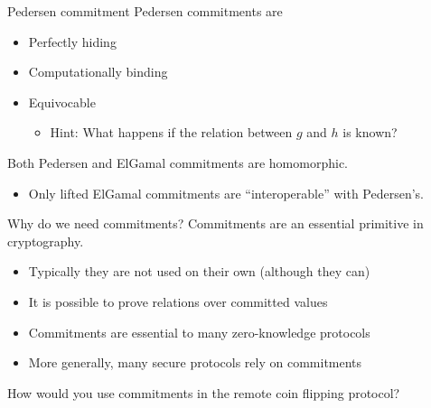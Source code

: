 \begin{frame}{Pedersen commitment}
  Pedersen commitments are
  \begin{itemize}[<+(1)->]
    \item Perfectly hiding
    \item Computationally binding
    \item Equivocable
    \begin{itemize}
      \item Hint: What happens if the relation between $g$ and $h$ is known?
    \end{itemize}
  \end{itemize}

  \vspace*{1em}

  \pause
  Both Pedersen and ElGamal commitments are homomorphic.
  \begin{itemize}
    \item Only lifted ElGamal commitments are \enquote{interoperable} with Pedersen's.
  \end{itemize}
\end{frame}

\begin{frame}{Why do we need commitments?}
  Commitments are an essential primitive in cryptography.
  \begin{itemize}[<+(1)->]
    \item Typically they are not used on their own (although they can)
    \item It is possible to prove relations over committed values
    \item Commitments are essential to many zero-knowledge protocols
    \item More generally, many secure protocols rely on commitments
  \end{itemize}

  \vspace*{1em}

  \pause
  How would you use commitments in the remote coin flipping protocol?
\end{frame}

